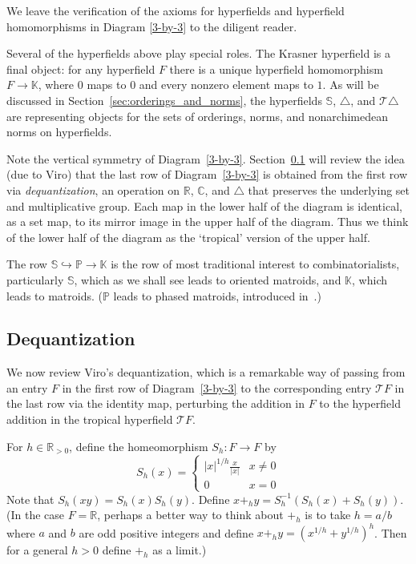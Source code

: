 \documentclass[10pt, preprint]{article}
\theoremstyle{definition}
\begin{document}
We leave the verification of the axioms for hyperfields and hyperfield
homomorphisms in Diagram \eqref{3-by-3} to the diligent reader.

Several of the hyperfields above play special roles. The Krasner
hyperfield is a final object: for any hyperfield $F$ there is a unique
hyperfield homomorphism $F \to \mathbb{K}$, where $0$ maps to $0$ and
every nonzero element maps to $1$. As will be discussed in
Section~\ref{sec:orderings_and_norms}, the hyperfields $\mathbb{S}$,
$\triangle $, and $\mathcal{T }\triangle $ are representing objects for
the sets of orderings, norms, and nonarchimedean norms on hyperfields.

Note the vertical symmetry of Diagram~\eqref{3-by-3}.
Section~\ref{sec:dequantization} will review the idea (due to Viro) that
the last row of Diagram~\eqref{3-by-3} is obtained from the first row
via \emph{dequantization}, an operation on $\mathbb{R}$, $\mathbb{C}$,
and $\triangle $ that preserves the underlying set and multiplicative
group. Each map in the lower half of the diagram is identical, as a set
map, to its mirror image in the upper half of the diagram. Thus we think
of the lower half of the diagram as the `tropical' version of the upper
half.

The row $\mathbb{S}\hookrightarrow \mathbb{P}\to \mathbb{K}$ is the row
of most traditional interest to combinatorialists, particularly
$\mathbb{S}$, which as we shall see leads to oriented matroids, and
$\mathbb{K}$, which leads to matroids. ($\mathbb{P}$ leads to phased
matroids, introduced in~\cite{Anderson-Delucchi}.)

\subsection{Dequantization}%
\label{sec:dequantization}

We now review Viro's dequantization, which is a remarkable way of
passing from an entry $F$ in the first row of Diagram~\eqref{3-by-3} to
the corresponding entry $\mathcal{T }F$ in the last row via the identity
map, perturbing the addition in $F$ to the hyperfield addition in the
tropical hyperfield $\mathcal{T }F$.

For $h \in \mathbb{R}_{>0}$, define the homeomorphism $S_{h} : F
\to F$ by
%
\begin{equation*}
S_{h}(x) =
%
\begin{cases}
|x|^{1/h} \frac{x}{|x|}
& x \neq 0
\\
0
& x = 0
\end{cases}
%
\end{equation*}
%
Note that $S_{h}(xy) = S_{h}(x)S_{h}(y)$. Define $x +_{h} y = S_{h}
^{-1}(S_{h}(x) + S_{h}(y))$. (In the case $F = \mathbb R$, perhaps a better way to think about
$+_{h}$ is to take $h = a/b$ where $a$ and $b$ are odd positive integers
and define $x +_{h} y = (x^{1/h} + y^{1/h})^{h}$. Then for a general
$h >0$ define $+_{h}$ as a limit.)
\end{document}
